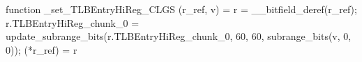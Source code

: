 function _set_TLBEntryHiReg_CLGS (r_ref, v) = {
    r = __bitfield_deref(r_ref);
    r.TLBEntryHiReg_chunk_0 = update_subrange_bits(r.TLBEntryHiReg_chunk_0, 60, 60, subrange_bits(v, 0, 0));
    (*r_ref) = r
}
